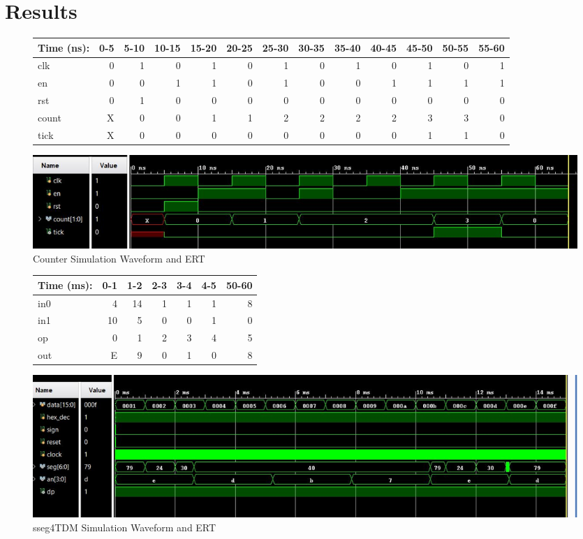\documentclass[11pt]{article}
\begin{document}
\section*{Results}

\begin{figure}[ht]\centering
	
	\begin{tabular}{l|rrrrrrrrrrrr}	
		Time (ns): & 0-5 & 5-10 & 10-15 & 15-20 & 20-25 & 25-30 & 30-35 & 35-40 & 40-45 & 45-50 & 50-55 & 55-60 \\
		\midrule
		clk     & 0 & 1 & 0 & 1 & 0 & 1 & 0 & 1 & 0 & 1 & 0 & 1\\
		en  	& 0 & 0 & 1 & 1 & 0 & 1 & 0 & 0 & 1 & 1 & 1 & 1\\
		rst 	& 0 & 1 & 0 & 0 & 0	& 0 & 0 & 0 & 0	& 0 & 0 & 0\\
		\midrule
		count 	& X & 0 & 0 & 1 & 1 & 2 & 2	& 2 & 2 & 3 & 3 & 0 \\
		tick	& X & 0 & 0 & 0 & 0 & 0 & 0	& 0 & 0 & 1 & 1 & 0 \\
		\bottomrule
	\end{tabular}
	\bigskip
	\includegraphics[width=1\textwidth,angle=0,origin=c]{counterWaveform}
	\caption{Counter Simulation Waveform and ERT}
	\label{fig:sim_with_table}
\end{figure}

\begin{figure}[ht]\centering
	
	\begin{tabular}{l|rrrrrr}
		Time (ms): & 0-1 & 1-2 & 2-3 & 3-4 & 4-5 & 50-60 \\
		\midrule
		in0 & 4  & 14& 1 & 1 & 1 & 8 \\
		in1 & 10 & 5 & 0 & 0 & 1 & 0 \\
		op  & 0  & 1 & 2 & 3 & 4 & 5 \\
		\midrule
		out & E  & 9 & 0 & 1 & 0 & 8 \\
		\bottomrule
	\end{tabular}
	\bigskip
	\includegraphics[width=1\textwidth,angle=0,origin=c]{sseg4tdmWaveform}
	\caption{sseg4TDM Simulation Waveform and ERT}
	\label{fig:sim_with_table}
\end{figure}
\end{document}
